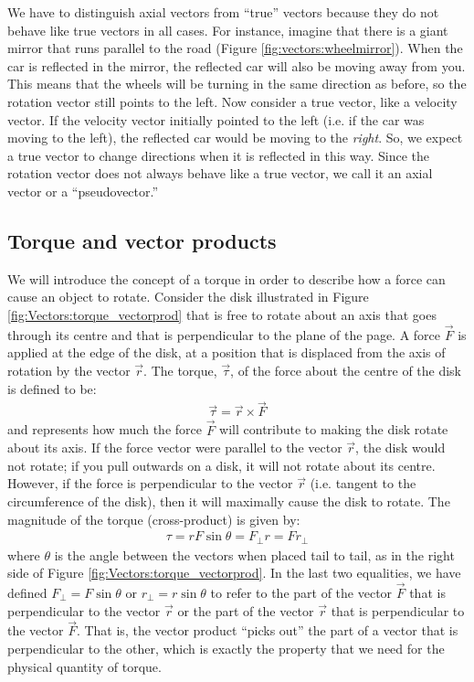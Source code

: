 We have to distinguish axial vectors from ``true'' vectors because they do not behave like true vectors in all cases. 
For instance, imagine that there is a giant mirror that runs parallel to the road (Figure \ref{fig:vectors:wheelmirror}). When the car is reflected in the mirror, the reflected car will also be moving away from you. This means that the wheels will be turning in the same direction as before, so the rotation vector still points to the left. Now consider a true vector, like a velocity vector. If the velocity vector initially pointed to the left (i.e. if the car was moving to the left), the reflected car would be moving to the \textit{right}. So, we expect a true vector to change directions when it is reflected in this way. Since the rotation vector does not always behave like a true vector, we call it an axial vector or a ``pseudovector.''



\subsection{Torque and vector products}
We will introduce the concept of a torque in order to describe how a force can cause an object to rotate. Consider the disk illustrated in Figure \ref{fig:Vectors:torque_vectorprod} that is free to rotate about an axis that goes through its centre and that is perpendicular to the plane of the page. A force $\vec F$ is applied at the edge of the disk, at a position that is displaced from the axis of rotation by the vector $\vec r$. The torque, $\vec \tau$, of the force about the centre of the disk is defined to be:
\begin{align*}
\vec\tau=\vec r\times \vec F
\end{align*}
and represents how much the force $\vec F$ will contribute to making the disk rotate about its axis. If the force vector were parallel to the vector $\vec r$, the disk would not rotate; if you pull outwards on a disk, it will not rotate about its centre. However, if the force is perpendicular to the vector $\vec r$ (i.e. tangent to the circumference of the disk), then it will maximally cause the disk to rotate. The magnitude of the torque (cross-product) is given by:
\begin{align*}
\tau =rF\sin\theta=F_{\perp}r=Fr_\perp
\end{align*}
where $\theta$ is the angle between the vectors when placed tail to tail, as in the right side of Figure \ref{fig:Vectors:torque_vectorprod}. In the last two equalities, we have defined $F_\perp=F\sin\theta$ or $r_\perp=r\sin\theta$ to refer to the part of the vector $\vec F$ that is perpendicular to the vector $\vec r$ or the part of the vector $\vec r$ that is perpendicular to the vector $\vec F$. That is, the vector product ``picks out'' the part of a vector that is perpendicular to the other, which is exactly the property that we need for the physical quantity of torque.

